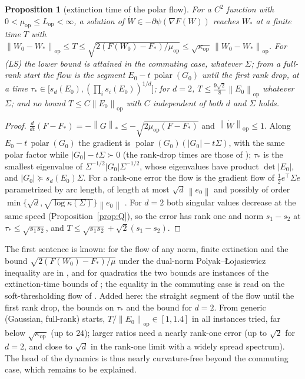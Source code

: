 \documentclass[11pt]{article}
\newtheorem{proposition}[theorem]{Proposition}
\theoremstyle{remark}
\newcommand{\norm}[1]{\left\|#1\right\|}
\newcommand{\nop}[1]{\left\|#1\right\|_{\mathrm{op}}}
\newcommand{\nnuc}[1]{\left\|#1\right\|_{*}}
\newcommand{\abs}[1]{\left|#1\right|}
\newcommand{\polar}{\operatorname{polar}}
\newcommand{\Lop}{L_{\mathrm{op}}}
\newcommand{\muop}{\mu_{\mathrm{op}}}
\newcommand{\kop}{\kappa_{\mathrm{op}}}
\begin{document}
\begin{proposition}[extinction time of the polar flow]\label{prop:ext}
For a $C^2$ function with $0<\muop\le\Lop<\infty$, a solution of $\dot W\in-\partial\psi(\nabla F(W))$ reaches $W_\ast$ at a finite time
$T$ with $\nop{W_0-W_\ast}\le T\le\sqrt{2(F(W_0)-F_\ast)/\muop}\le\sqrt{\kop}\,\nop{W_0-W_\ast}$. For (LS) the lower bound
is attained in the commuting case, whatever $\Sigma$; from a full-rank start the flow is the segment
$E_0-t\,\polar(G_0)$ until the first rank drop, at a time
$\tau_\ast\in\big[s_d(E_0),(\prod_is_i(E_0))^{1/d}\big]$; for $d=2$, $T\le\frac{9\sqrt2}8\nop{E_0}$ whatever $\Sigma$; and
no bound $T\le C\nop{E_0}$ with $C$ independent of both $d$ and $\Sigma$ holds.
\end{proposition}
\begin{proof}
$\frac d{dt}(F-F_\ast)=-\nnuc G\le-\sqrt{2\muop(F-F_\ast)}$ \cite{leplat2025norm} and $\nop{\dot W}\le1$. Along
$E_0-t\,\polar(G_0)$ the gradient is $\polar(G_0)(\abs{G_0}-t\Sigma)$, with the same polar factor while
$\abs{G_0}-t\Sigma\succ0$ (the rank-drop times are those of \cite{shulgin2026quadratic}); $\tau_\ast$ is the smallest
eigenvalue of $\Sigma^{-1/2}\abs{G_0}\Sigma^{-1/2}$, whose eigenvalues have product $\det\abs{E_0}$, and
$\abs{G_0}\succeq s_d(E_0)\Sigma$. For a rank-one error the flow is the gradient flow of $\frac12e^\top\Sigma e$
parametrized by arc length, of length at most $\sqrt d\,\norm{e_0}$ and possibly of order
$\min\{\sqrt d,\sqrt{\log\kappa(\Sigma)}\}\norm{e_0}$ \cite{gupta2021path}. For $d=2$ both singular values decrease at the
same speed (Proposition~\ref{prop:Q}), so the error has rank one and norm $s_1-s_2$ at
$\tau_\ast\le\sqrt{s_1s_2}$, and $T\le\sqrt{s_1s_2}+\sqrt2(s_1-s_2)$.
\end{proof}
The first sentence is known: for the flow of any norm, finite extinction and the bound
$\sqrt{2(F(W_0)-F_\ast)/\mu}$ under the dual-norm Polyak--\L{}ojasiewicz inequality are in \cite{leplat2025norm}, and
for quadratics the two bounds are instances of the extinction-time bounds of \cite{bungert2021nonlinear}; the equality
in the commuting case is read on the soft-thresholding flow of \cite{vasudeva2025muon}. Added here: the straight
segment of the flow until the first rank drop, the bounds on $\tau_\ast$ and the bound for $d=2$. From generic
(Gaussian, full-rank) starts, $T/\nop{E_0}\in[1,1.4]$ in all instances tried, far below $\sqrt{\kop}$ (up to $24$);
larger ratios need a nearly rank-one error (up to $\sqrt2$ for $d=2$, and close to $\sqrt d$ in the rank-one limit
with a widely spread spectrum). The head of the dynamics is thus nearly curvature-free beyond the commuting case, which
remains to be explained.
\end{document}
